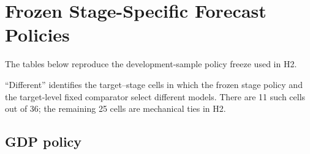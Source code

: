 \section{Frozen Stage-Specific Forecast Policies}

\label{app:policies}
\setcounter{table}{0}

The tables below reproduce the development-sample policy freeze used in H2.

``Different'' identifies the target--stage cells in which the frozen stage
policy and the target-level fixed comparator select different models. There
are 11 such cells out of 36; the remaining 25 cells are mechanical ties in H2.

\subsection{GDP policy}

\begin{table}[H]

\centering

\caption{Frozen GDP forecasting policy}

\label{tab:gdp_policy}

\footnotesize


\end{table}

